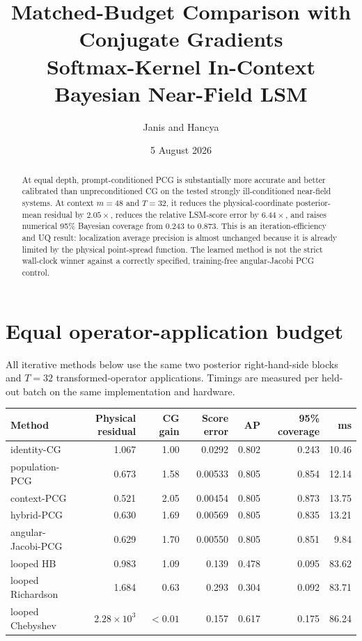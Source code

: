 \documentclass[10pt]{article}
\title{Matched-Budget Comparison with Conjugate Gradients\\
\large Softmax-Kernel In-Context Bayesian Near-Field LSM}
\author{Janis and Hancya}
\date{5 August 2026}
\begin{document}
\maketitle
\vspace{-2.0em}

\begin{abstract}
At equal depth, prompt-conditioned PCG is substantially more accurate and
better calibrated than unpreconditioned CG on the tested strongly
ill-conditioned near-field systems.  At context $m=48$ and $T=32$, it reduces
the physical-coordinate posterior-mean residual by $2.05\times$, reduces the
relative LSM-score error by $6.44\times$, and raises numerical 95\% Bayesian
coverage from 0.243 to 0.873.  This is an iteration-efficiency and UQ result:
localization average precision is almost unchanged because it is already
limited by the physical point-spread function.  The learned method is not the
strict wall-clock winner against a correctly specified, training-free
angular-Jacobi PCG control.
\end{abstract}

\section*{Equal operator-application budget}

All iterative methods below use the same two posterior right-hand-side blocks
and $T=32$ transformed-operator applications.  Timings are measured per
held-out batch on the same implementation and hardware.

\begin{center}
\small
\begin{tabular}{lrrrrrr}
\toprule
Method & Physical residual & CG gain & Score error & AP & 95\% coverage & ms\\
\midrule
identity-CG          & 1.067 & 1.00 & 0.0292 & 0.802 & 0.243 & 10.46\\
population-PCG       & 0.673 & 1.58 & 0.00533 & 0.805 & 0.854 & 12.14\\
context-PCG          & 0.521 & 2.05 & 0.00454 & 0.805 & 0.873 & 13.75\\
hybrid-PCG           & 0.630 & 1.69 & 0.00569 & 0.805 & 0.835 & 13.21\\
angular-Jacobi-PCG   & 0.629 & 1.70 & 0.00550 & 0.805 & 0.851 &  9.84\\
looped HB            & 0.983 & 1.09 & 0.139 & 0.478 & 0.095 & 83.62\\
looped Richardson    & 1.684 & 0.63 & 0.293 & 0.304 & 0.092 & 83.71\\
looped Chebyshev     & $2.28\times10^3$ & $<0.01$ & 0.157 & 0.617 & 0.175 & 86.24\\
\bottomrule
\end{tabular}
\end{center}
\end{document}
